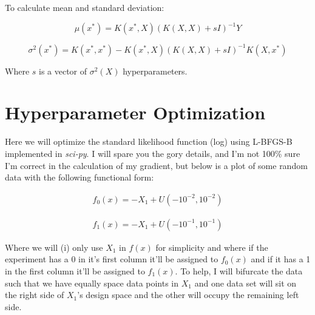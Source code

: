 \documentclass[12pt]{article}
\begin{document}
\vspace{5mm}

To calculate mean and standard deviation:

\begin{equation}
\mu(x^*) = K(x^*,X)(K(X,X)+sI)^{-1}Y
\end{equation}

\begin{equation}
\sigma^2(x^*) = K(x^*,x^*)-K(x^*,X)(K(X,X)+sI)^{-1}K(X,x^*)
\end{equation}

\vspace{5mm}

Where $s$ is a vector of $\sigma^2(X)$ hyperparameters.

\section{Hyperparameter Optimization}

Here we will optimize the standard likelihood function (log) using L-BFGS-B implemented in \emph{sci-py}. I will spare you the gory details, and I'm not 100\% sure I'm correct in the calculation of my gradient, but below is a plot of some random data with the following functional form:

\begin{align*}
f_0(x)=-X_1 + U(-10^{-2},10^{-2})
\end{align*}

\begin{align*}
f_1(x)=-X_1 + U(-10^{-1},10^{-1})
\end{align*}

\vspace{5mm}

Where we will (i) only use $X_1$ in $f(x)$ for simplicity and where if the experiment has a 0 in it's first column it'll be assigned to $f_0(x)$ and if it has a 1 in the first column it'll be assigned to $f_1(x)$. To help, I will bifurcate the data such that we have equally space data points in $X_1$ and one data set will sit on the right side of $X_1$'s design space and the other will occupy the remaining left side. 
\end{document}
